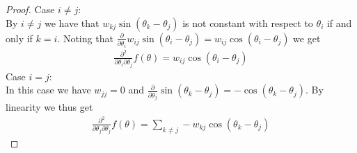 \documentclass[12pt,a4paper]{article}
\theoremstyle{mythm}
\begin{document}
\begin{proof}
Case $ i \neq j$: \\
By $ i \neq j  $ we have that $ w _{ kj } \sin( \theta_k - \theta_j  )  $ is not constant with respect to $ \theta_i $ if and only if $ k = i $. Noting that $ \frac{ \partial
}{ \partial \theta_i } w _{ ij } \sin( \theta_i - \theta_j ) = w _{ ij } \cos( \theta_i - \theta_j )   $ we get
\begin{align*}
\frac{ \partial ^{ 2 }  }{ \partial \theta_i \partial \theta_j } f (\theta) = w _{ ij } \cos( \theta_i - \theta_j ) 
\end{align*} 
Case $ i = j $: \\
In this case we have $ w _{ jj } = 0 $ and $ \frac{ \partial  }{ \partial \theta_j } \sin( \theta_k - \theta_j  ) = - \cos( \theta_k - \theta_j ) $. By linearity we thus get
\begin{align*}
\frac{ \partial ^{ 2 }  }{ \partial \theta_j \partial \theta_j } f(\theta) = \sum_{ k \neq j   }^{  } -w _{ kj } \cos( \theta_k - \theta_j ) 
\end{align*} 
\end{proof}
\end{document}
